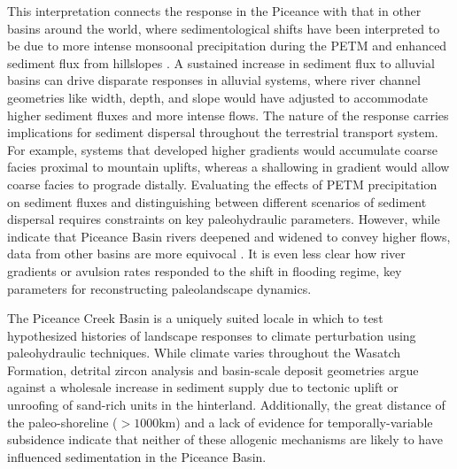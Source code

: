 \documentclass[draft]{compact_proposal}\usepackage[]{graphicx}\usepackage[]{color}
\begin{document}
This interpretation connects the response in the Piceance with that in other basins around the world, where sedimentological shifts have been interpreted to be due to more intense monsoonal precipitation during the PETM and enhanced sediment flux from hillslopes .
A sustained increase in sediment flux to alluvial basins can drive disparate responses in alluvial systems, where river channel geometries like width, depth, and slope would have adjusted to accommodate higher sediment fluxes and more intense flows.
The nature of the response carries implications for sediment dispersal throughout the terrestrial transport system.
For example, systems that developed higher gradients would accumulate coarse facies proximal to mountain uplifts, whereas a shallowing in gradient would allow coarse facies to prograde distally.
Evaluating the effects of PETM precipitation on sediment fluxes and distinguishing between different scenarios of sediment dispersal requires constraints on key paleohydraulic parameters.
However, while \textcite{foreman_fluvial_2012} indicate that Piceance Basin rivers deepened and widened to convey higher flows, data from other basins are more equivocal \parencite{chen_estimating_2018}. 
It is even less clear how river gradients or avulsion rates responded to the shift in flooding regime, key parameters for reconstructing paleolandscape dynamics.

The Piceance Creek Basin is a uniquely suited locale in which to test hypothesized histories of landscape responses to climate perturbation using paleohydraulic techniques. 
While climate varies throughout the Wasatch Formation, detrital zircon analysis and basin-scale deposit geometries argue against a wholesale increase in sediment supply due to tectonic uplift or unroofing of sand-rich units in the hinterland.
Additionally, the great distance of the paleo-shoreline ($>1000$km) and a lack of evidence for temporally-variable subsidence indicate that neither of these allogenic mechanisms are likely to have influenced sedimentation in the Piceance Basin.
\end{document}
